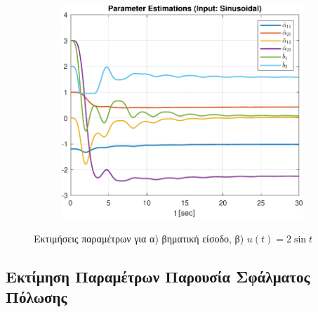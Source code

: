 \documentclass[a4paper,12pt]{article}
\begin{document}
\begin{figure}[htbp]
\begin{subfigure}[b]{0.45\textwidth}
    \includegraphics[width=\textwidth]{plot/task1_parameter_estimations_sinusoidal.pdf}
    \caption{}
    \label{fig:task1_parameter_estimations_sinusoidal}
  \end{subfigure}
  \caption{Εκτιμήσεις παραμέτρων για α) βηματική είσοδο, β) $u(t) = 2 \sin t$}
  \label{fig:task1_parameter_estimations}
\end{figure}


\subsection*{Εκτίμηση Παραμέτρων Παρουσία Σφάλματος Πόλωσης}
\end{document}
